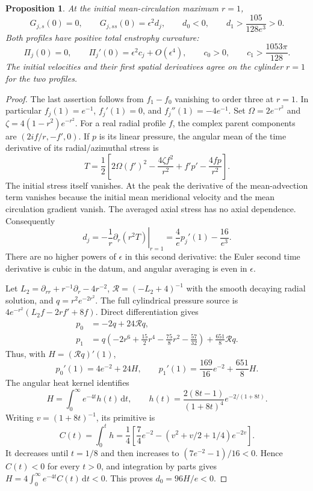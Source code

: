 \documentclass[11pt]{article}
\newtheorem{proposition}[theorem]{Proposition}
\theoremstyle{remark}
\newcommand{\dd}{\,\mathrm d}
\begin{document}
\begin{proposition}\label{prop:helicalMeanFeedback}
At the initial mean-circulation maximum $r=1$,
\[
 G_{j,s}(0)=0,\qquad G_{j,ss}(0)=\epsilon^2 d_j,\qquad
 d_0<0,\qquad d_1>\frac{105}{128e^3}>0.
\]
Both profiles have positive total enstrophy curvature:
\[
 \Pi_j(0)=0,\qquad
 \Pi_j'(0)=\epsilon^2 c_j+O(\epsilon^4),\qquad
 c_0>0,\qquad c_1>\frac{1053\pi}{128}.
\]
The initial velocities and their first spatial derivatives agree on
the cylinder $r=1$ for the two profiles.
\end{proposition}

\begin{proof}
The last assertion follows from $f_1-f_0$ vanishing to order three
at $r=1$. In particular $f_j(1)=e^{-1}$, $f_j'(1)=0$, and
$f_j''(1)=-4e^{-1}$. Set $\Omega=2e^{-r^2}$ and
$\zeta=4(1-r^2)e^{-r^2}$.
For a real radial profile $f$, the complex parent components are
$(2if/r,-f',0)$. If $p$ is its linear pressure, the angular mean
of the time derivative of its radial/azimuthal stress is
\[
 T=\frac12\left[2\Omega(f')^2-\frac{4\zeta f^2}{r^2}
                              +f'p'-\frac{4fp}{r^2}\right].
\]
The initial stress itself vanishes. At the peak the derivative of
the mean-advection term vanishes because the initial mean meridional
velocity and the mean circulation gradient vanish. The averaged axial
stress has no axial dependence. Consequently
\begin{equation}\label{eq:helicalPeakAcceleration}
 d_j=-\left.\frac1r\partial_r(r^2T)\right|_{r=1}
                         =\frac4e p_j'(1)-\frac{16}{e^3}.
\end{equation}
There are no higher powers of $\epsilon$ in this second derivative:
the Euler second time derivative is cubic in the datum, and angular
averaging is even in $\epsilon$.

Let $L_2=\partial_{rr}+r^{-1}\partial_r-4r^{-2}$,
$\mathcal R=(-L_2+4)^{-1}$ with the smooth decaying radial solution,
and $q=r^2e^{-2r^2}$. The full cylindrical pressure source is
$4e^{-r^2}(L_2f-2rf'+8f)$. Direct differentiation gives
\begin{align*}
 p_0&=-2q+24\mathcal Rq,\\
 p_1&=q\left(-2r^6+\frac{15}2r^4-\frac{75}8r^2-\frac{57}{32}\right)
                                      +\frac{651}8\mathcal Rq.
\end{align*}
Thus, with $H=(\mathcal Rq)'(1)$,
\[
 p_0'(1)=4e^{-2}+24H,\qquad
 p_1'(1)=\frac{169}{16}e^{-2}+\frac{651}8H.
\]
The angular heat kernel identifies
\[
 H=\int_0^\infty e^{-4t}h(t)\dd t,\qquad
 h(t)=\frac{2(8t-1)}{(1+8t)^4}e^{-2/(1+8t)}.
\]
Writing $v=(1+8t)^{-1}$, its primitive is
\[
 C(t)=\int_0^t h
  =\frac14\left[\frac74e^{-2}
                    -(v^2+v/2+1/4)e^{-2v}\right].
\]
It decreases until $t=1/8$ and then increases to
$(7e^{-2}-1)/16<0$. Hence $C(t)<0$ for every $t>0$, and integration
by parts gives $H=4\int_0^\infty e^{-4t}C(t)\dd t<0$.
This proves $d_0=96H/e<0$.


\end{proof}
\end{document}
